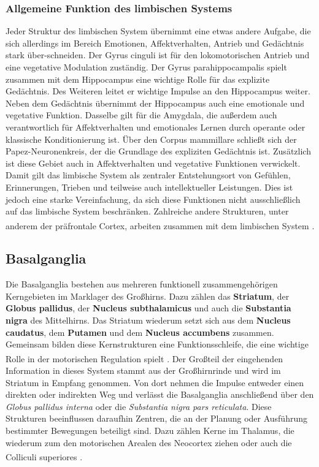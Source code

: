 \documentclass[12pt,a4paper,pdftex]{article}
\begin{document}
\subsubsection*{Allgemeine Funktion des limbischen Systems}
Jeder Struktur des limbischen System übernimmt eine etwas andere Aufgabe, die sich allerdings im Bereich Emotionen, Affektverhalten, Antrieb und Gedächtnis stark über-schneiden. Der Gyrus cinguli ist für den lokomotorischen Antrieb und eine vegetative Modulation zuständig. Der Gyrus parahippocampalis spielt zusammen mit dem Hippocampus eine wichtige Rolle für das explizite Gedächtnis. Des Weiteren leitet er wichtige Impulse an den Hippocampus weiter. Neben dem Gedächtnis übernimmt der Hippocampus auch eine emotionale und vegetative Funktion. Dasselbe gilt für die Amygdala, die außerdem auch verantwortlich für Affektverhalten und emotionales Lernen durch operante oder klassische Konditionierung ist. Über den Corpus mammillare schließt sich der Papez-Neuronenkreis, der die Grundlage des expliziten Gedächtnis ist. Zusätzlich ist diese Gebiet auch in Affektverhalten und vegetative Funktionen verwickelt. Damit gilt das limbische System als zentraler Entstehungsort von Gefühlen, Erinnerungen, Trieben und teilweise auch intellektueller Leistungen. Dies ist jedoch eine starke Vereinfachung, da sich diese Funktionen nicht ausschließlich auf das limbische System beschränken. Zahlreiche andere Strukturen, unter anderem der präfrontale Cortex, arbeiten zusammen mit dem limbischen System \textsuperscript{\cite[9]{trepel2011neuroanatomie}}.    

\newpage
\subsection{Basalganglia} \label{subsec:basalganglien} 
Die Basalganglia bestehen aus mehreren funktionell zusammengehörigen Kerngebieten im Marklager des Großhirns. Dazu zählen das \textbf{Striatum}, der \textbf{Globus pallidus}, der \textbf{Nucleus subthalamicus}  und auch die \textbf{Substantia nigra}  des Mittelhirns. Das Striatum wiederum setzt sich aus dem \textbf{Nucleus caudatus}, dem \textbf{Putamen} und dem \textbf{Nucleus accumbens} zusammen. Gemeinsam bilden diese Kernstrukturen eine Funktionsschleife, die eine wichtige Rolle in der motorischen Regulation spielt \textsuperscript{\cite[9]{trepel2011neuroanatomie}}. Der Großteil der eingehenden Information in dieses System stammt aus der Großhirnrinde und wird im Striatum in Empfang genommen. Von dort nehmen die Impulse entweder einen direkten oder indirekten Weg und verlässt die Basalganglia anschließend über den \textit{Globus pallidus interna} oder die \textit{Substantia nigra pars reticulata}. Diese Strukturen beeinflussen daraufhin Zentren, die an der Planung oder Ausführung bestimmter Bewegungen beteiligt sind. Dazu zählen Kerne im Thalamus, die wiederum zum den motorischen Arealen des Neocortex ziehen oder auch die Colliculi superiores \textsuperscript{\cite[17]{paxinos2014rat}}.   
\end{document}
